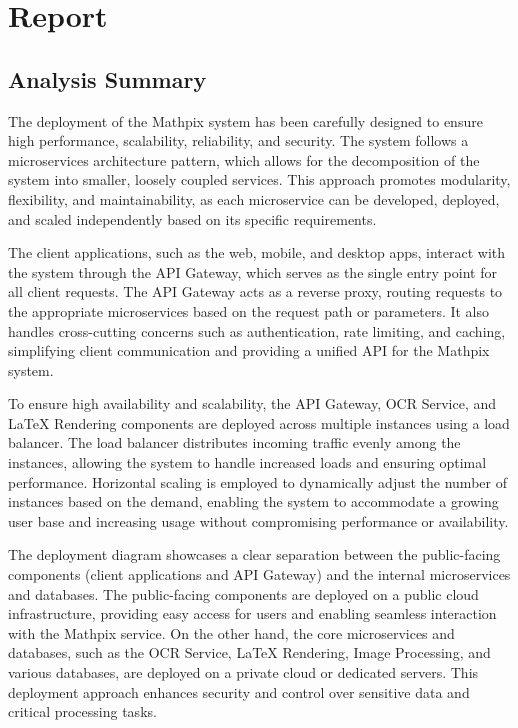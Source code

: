 \documentclass{article}
\begin{document}
\section{Report}
\subsection{Analysis Summary}
The deployment of the Mathpix system has been carefully designed to ensure high performance, scalability, reliability, and security. The system follows a microservices architecture pattern, which allows for the decomposition of the system into smaller, loosely coupled services. This approach promotes modularity, flexibility, and maintainability, as each microservice can be developed, deployed, and scaled independently based on its specific requirements.

The client applications, such as the web, mobile, and desktop apps, interact with the system through the API Gateway, which serves as the single entry point for all client requests. The API Gateway acts as a reverse proxy, routing requests to the appropriate microservices based on the request path or parameters. It also handles cross-cutting concerns such as authentication, rate limiting, and caching, simplifying client communication and providing a unified API for the Mathpix system.

To ensure high availability and scalability, the API Gateway, OCR Service, and LaTeX Rendering components are deployed across multiple instances using a load balancer. The load balancer distributes incoming traffic evenly among the instances, allowing the system to handle increased loads and ensuring optimal performance. Horizontal scaling is employed to dynamically adjust the number of instances based on the demand, enabling the system to accommodate a growing user base and increasing usage without compromising performance or availability.

The deployment diagram showcases a clear separation between the public-facing components (client applications and API Gateway) and the internal microservices and databases. The public-facing components are deployed on a public cloud infrastructure, providing easy access for users and enabling seamless interaction with the Mathpix service. On the other hand, the core microservices and databases, such as the OCR Service, LaTeX Rendering, Image Processing, and various databases, are deployed on a private cloud or dedicated servers. This deployment approach enhances security and control over sensitive data and critical processing tasks.
\end{document}
